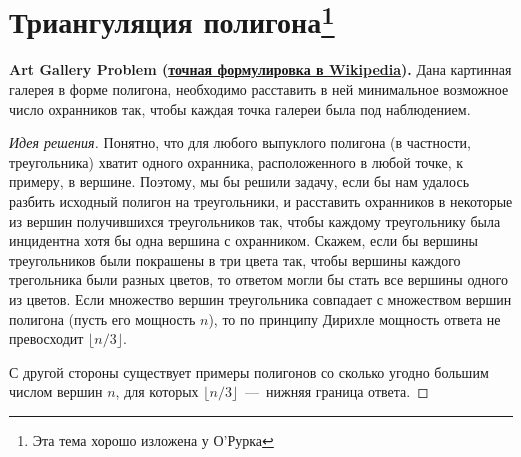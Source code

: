 \section[title]{Триангуляция полигона\footnote{Эта тема хорошо изложена у О'Рурка}}

\textbf{Art Gallery Problem (\href{http://en.wikipedia.org/wiki/Art_gallery_problem}{точная формулировка в Wikipedia}).} 
Дана картинная галерея в форме полигона, необходимо расставить в ней минимальное возможное число охранников так, 
чтобы каждая точка галереи была под наблюдением.
\begin{proof}[Идея решения]
\label{ArtGalleryIdea}
Понятно, что для любого выпуклого полигона (в частности, треугольника) хватит одного охранника, 
расположенного в любой точке, к примеру, в вершине. Поэтому, мы бы решили задачу, если бы нам удалось разбить исходный полигон 
на треугольники, и расставить охранников в некоторые из вершин получившихся треугольников так, чтобы каждому треугольнику была
инцидентна хотя бы одна вершина с охранником. Скажем, если бы вершины треугольников были покрашены в три цвета
так, чтобы вершины каждого трегольника были разных цветов, то ответом могли бы стать все вершины одного из цветов. 
Если множество вершин треугольника совпадает с множеством вершин полигона (пусть его мощность $n$), то по принципу Дирихле 
мощность ответа не превосходит $\lfloor n / 3 \rfloor$. 

С другой стороны существует примеры полигонов со сколько угодно большим числом вершин $n$, для которых 
$\lfloor n / 3 \rfloor$~---~нижняя граница ответа.
\end{proof}

